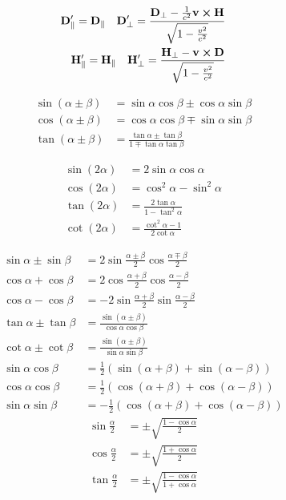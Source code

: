 \documentclass[11pt,twoside]{article}
\begin{document}
\begin{multicols}{3}
\begin{equation}
\begin{split}
\vb{D}'_\parallel = \vb{D}_\parallel \quad \vb{D}'_\perp = \frac{\vb{D}_\perp - \frac{1}{c^2}\vb{v}\cross\vb{H}}{\sqrt{1-\frac{v^2}{c^2}}} \\
\vb{H}'_\parallel = \vb{H}_\parallel \quad \vb{H}'_\perp = \frac{\vb{H}_\perp - \vb{v}\cross\vb{D}}{\sqrt{1-\frac{v^2}{c^2}}}
\end{split}
\end{equation}

\begin{equation}
\begin{split}
\sin(\alpha\pm\beta)&=\sin\alpha\cos\beta\pm\cos\alpha\sin\beta \\
\cos(\alpha\pm\beta)&=\cos\alpha\cos\beta\mp\sin\alpha\sin\beta \\
\tan(\alpha\pm\beta)&=\frac{\tan\alpha\pm\tan\beta}{1\mp\tan\alpha\tan\beta}
\end{split}
\end{equation}

\begin{equation}
\begin{split}
\sin(2\alpha)&=2\sin\alpha\cos\alpha \\
\cos(2\alpha)&=\cos^2\alpha -\sin^2\alpha \\
\tan(2\alpha)&=\frac{2\tan\alpha}{1-\tan^2\alpha}\\
\cot(2\alpha)&=\frac{\cot^2\alpha - 1}{2\cot\alpha}
\end{split}
\end{equation}

\begin{equation}
\begin{split}
\sin\alpha\pm\sin\beta&=2\sin\frac{\alpha\pm\beta}{2}\cos\frac{\alpha\mp\beta}{2} \\
\cos\alpha+\cos\beta&=2\cos\frac{\alpha+\beta}{2}\cos\frac{\alpha-\beta}{2} \\
\cos\alpha-\cos\beta&=-2\sin\frac{\alpha+\beta}{2}\sin\frac{\alpha-\beta}{2} \\
\tan\alpha \pm \tan\beta &= \frac{\sin(\alpha\pm\beta)}{\cos\alpha\cos\beta} \\
\cot\alpha \pm \cot\beta &= \frac{\sin(\alpha\pm\beta)}{\sin\alpha\sin\beta} \\
\sin\alpha\cos\beta&=\frac{1}{2}(\sin(\alpha+\beta)+\sin(\alpha-\beta)) \\
\cos\alpha\cos\beta&=\frac{1}{2}(\cos(\alpha+\beta)+\cos(\alpha-\beta)) \\
\sin\alpha\sin\beta &= -\frac{1}{2}(\cos(\alpha+\beta)+\cos(\alpha-\beta))
\end{split}
\end{equation}
\columnbreak
\begin{equation}
\begin{split}
\sin\frac{\alpha}{2}&=\pm\sqrt{\frac{1-\cos\alpha}{2}} \\
\cos\frac{\alpha}{2}&=\pm\sqrt{\frac{1+\cos\alpha}{2}} \\
\tan\frac{\alpha}{2}&=\pm\sqrt{\frac{1-\cos\alpha}{1+\cos\alpha}}
\end{split}
\end{equation}


\end{multicols}
\end{document}
